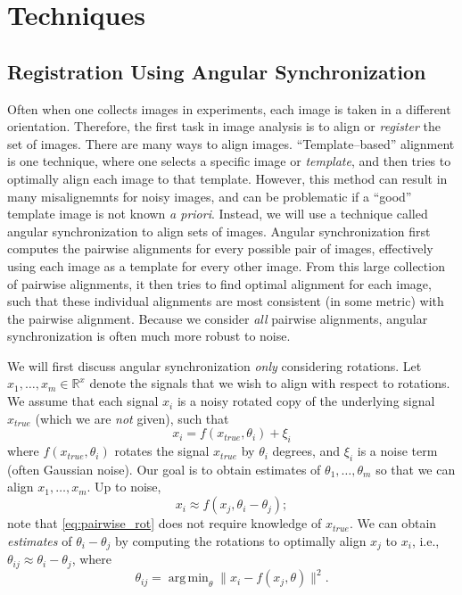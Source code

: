 \documentclass[11pt]{article}
\DeclareMathOperator*{\argmin}{arg\,min}
\begin{document}
\section{Techniques}

\subsection{Registration Using Angular Synchronization} \label{subsec:angsynch}

Often when one collects images in experiments, each image is taken in a different orientation. 
%
Therefore, the first task in image analysis is to align or {\em register} the set of images. 
%
There are many ways to align images. 
%
``Template--based'' alignment \cite{ahuja2007template} is one technique, where one selects a specific image or {\em template}, and then tries to optimally align each image to that template.
%
However, this method can result in many misalignemnts for noisy images, and can be problematic if a ``good'' template image is not known {\em a priori}. 
%
Instead, we will use a technique called angular synchronization\cite{singer2011angular} to align sets of images.
%
Angular synchronization first computes the pairwise alignments for every possible pair of images, effectively using each image as a template for every other image.
%
From this large collection of pairwise alignments, it then tries to find optimal alignment for each image, such that these individual alignments are most consistent (in some metric) with the pairwise alignment.
%
Because we consider {\em all} pairwise alignments, angular synchronization is often much more robust to noise. 

We will first discuss angular synchronization {\em only} considering rotations. 
%
Let $x_1, \dots, x_m \in \mathbb{R}^x$ denote the signals that we wish to align with respect to rotations.
%
We assume that each signal $x_i$ is a noisy rotated copy of the underlying signal $x_{true}$ (which we are {\em not} given), such that 
\begin{equation}
x_i = f(x_{true}, \theta_i) + \xi_i
\end{equation}
where $f(x_{true}, \theta_i)$ rotates the signal $x_{true}$ by $\theta_i$ degrees, and $\xi_i$ is a noise term (often Gaussian noise). 
%
Our goal is to obtain estimates of $\theta_1, \dots, \theta_m$ so that we can align $x_1, \dots, x_m$. 
%
Up to noise, 
\begin{equation} \label{eq:pairwise_rot}
x_i \approx f(x_j, \theta_i - \theta_j) ;
\end{equation}
 note that \eqref{eq:pairwise_rot} does not require knowledge of $x_{true}$.
%
We can obtain {\em estimates} of $\theta_i - \theta_j$ by computing the rotations to optimally align $x_j$ to $x_i$, 
i.e., $\theta_{ij} \approx \theta_i - \theta_j$, where
%
\begin{equation} \label{eq:opt_angle}
\theta_{ij} = \argmin_{\theta} \|x_i - f(x_j, \theta)\|^2.
\end{equation}
\end{document}

